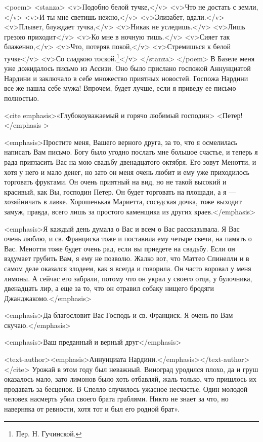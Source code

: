 <poem>  <stanza>  <v>Подобно  белой  тучке,</v> <v>Что  не  достать  с
земли,</v>  <v>И ты  мне  светишь  нежно,</v> <v>Элизабет,  вдали.</v>
<v>Плывет,  блуждает  тучка,</v>  <v>Никак  не  уследишь.</v>  <v>Лишь
грезою  приходит</v>  <v>Ко  мне   в  ночную  тишь.</v>  <v>Сияет  так
блаженно,</v>  <v>Что,   потеряв  покой,</v>  <v>Стремишься   к  белой
тучке</v>  <v>Со  сладкою   тоской.\footnote{Пер.  Н.  Гучинской.}</v>
</stanza>  </poem> В  Базеле  меня уже  дожидалось  письмо из  Ассизи.
Оно  было прислано  госпожой Аннунциатой  Нардини и  заключало в  себе
множество приятных новостей.  Госпожа Нардини все же  нашла себе мужа!
Впрочем, будет лучше, если я приведу ее письмо полностью.

<cite   emphasis>«Глубокоуважаемый   и    горячо   любимый   господин>
<Петер!</emphasis                                                    >

<emphasis>Простите меня, Вашего верного друга, за то, что я осмелилась
написать Вам письмо.  Богу было угодно послать мне  большое счастье, и
теперь я рада пригласить Вас  на мою свадьбу двенадцатого октября. Его
зовут Менотти, и хотя у него и мало денег, но зато он меня очень любит
и ему уже приходилось торговать фруктами. Он очень приятный на вид, но
не  такой  высокий  и  красивый,  как Вы,  господин  Петер.  Он  будет
торговать  на  площади,  а  я ---  хозяйничать  в  лавке.  Хорошенькая
Мариетта, соседская дочка,  тоже выходит замуж, правда,  всего лишь за
простого каменщика из других краев.</emphasis>

<emphasis>Я каждый день думала о Вас  и всем о Вас рассказывала. Я Вас
очень люблю,  и св. Франциска  тоже и  поставила ему четыре  свечи, на
память  о Вас.  Менотти  тоже будет  очень рад,  если  вы приедете  на
свадьбу. Если  он вздумает грубить Вам,  я ему не позволю.  Жалко вот,
что Маттео  Спинелли и в самом  деле оказался злодеем, как  я всегда и
говорила. Он часто воровал у меня лимоны. А сейчас его забрали, потому
что он украл у своего отца, у  булочника, двенадцать лир, а еще за то,
что он отравил собаку нищего бродяги Джанджакомо.</emphasis>

<emphasis>Да благословит  Вас Господь и  св. Франциск. Я очень  по Вам
скучаю.</emphasis>

<emphasis>Ваш преданный и верный друг</emphasis>

<text-author><emphasis>Аннунциата    Нардини.</emphasis></text-author>
</cite> Урожай в этом году был неважный. Виноград уродился плохо, да и
груш оказалось  мало, зато  лимонов было  хоть отбавляй,  жаль только,
что  пришлось их  продавать за  бесценок. В  Спелло случилось  ужасное
несчастье. Один  молодой человек насмерть убил  своего брата граблями.
Никто не знает  за что, но наверняка  от ревности, хотя тот  и был его
родной брат».

